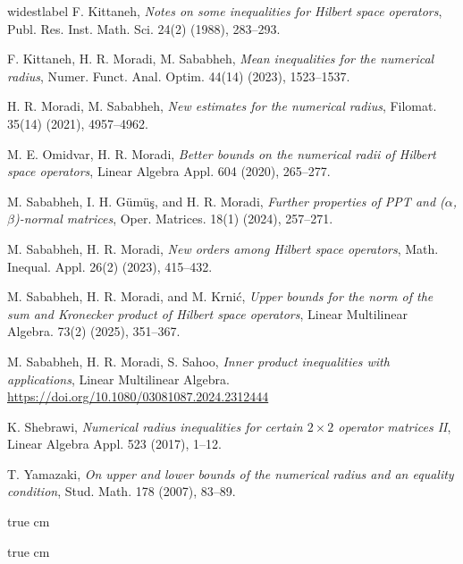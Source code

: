 \documentclass[12pt,twoside,reqno]{amsart}
\numberwithin{equation}{section}
\begin{document}
\begin{thebibliography}{widestlabel}
F. Kittaneh, {\it Notes on some inequalities for Hilbert space operators}, Publ. Res. Inst. Math. Sci. 24(2)
(1988), 283--293.

F. Kittaneh, H. R. Moradi, M. Sababheh, {\it Mean inequalities for the numerical radius}, Numer. Funct. Anal. Optim. 44(14) (2023), 1523--1537.

H. R. Moradi, M. Sababheh, {\it New estimates for the numerical radius}, Filomat. 35(14) (2021), 4957--4962.

M. E. Omidvar, H. R. Moradi, {\it Better bounds on the numerical radii of Hilbert space operators}, Linear Algebra Appl. 604 (2020), 265--277.


M. Sababheh, I. H. G\"um\"u\c s, and H. R. Moradi, {\it Further properties of PPT and ($\alpha$,$\beta$)-normal matrices}, Oper. Matrices. 18(1) (2024), 257--271.

M. Sababheh, H. R. Moradi, {\it New orders among Hilbert space operators}, Math. Inequal. Appl. 26(2) (2023), 415--432.

M. Sababheh, H. R. Moradi, and M. Krni\'c, {\it Upper bounds for the norm of the sum and Kronecker product of Hilbert space operators}, Linear Multilinear Algebra. 73(2) (2025), 351--367.

M. Sababheh, H. R. Moradi, S. Sahoo, {\it Inner product inequalities with applications}, Linear Multilinear Algebra. \url{https://doi.org/10.1080/03081087.2024.2312444}


K. Shebrawi, {\it Numerical radius inequalities for certain $2\times 2$ operator matrices II}, Linear Algebra Appl. 523 (2017), 1--12.

T. Yamazaki, {\it On upper and lower bounds of the numerical radius and an equality condition}, Stud. Math. 178 (2007), 83--89.
\end{thebibliography}




 true cm 






 true cm 

\end{document}
